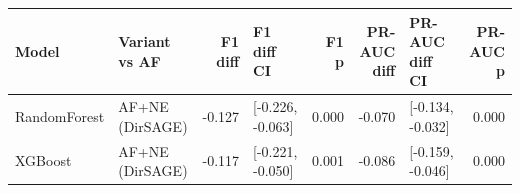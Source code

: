 \begin{tabular}{llrlrrlr}
\toprule
Model & Variant vs AF & F1 diff & F1 diff CI & F1 p & PR-AUC diff & PR-AUC diff CI & PR-AUC p \\
\midrule
RandomForest & AF+NE (DirSAGE) & -0.127 & [-0.226, -0.063] & 0.000 & -0.070 & [-0.134, -0.032] & 0.000 \\
XGBoost & AF+NE (DirSAGE) & -0.117 & [-0.221, -0.050] & 0.001 & -0.086 & [-0.159, -0.046] & 0.000 \\
\bottomrule
\end{tabular}
